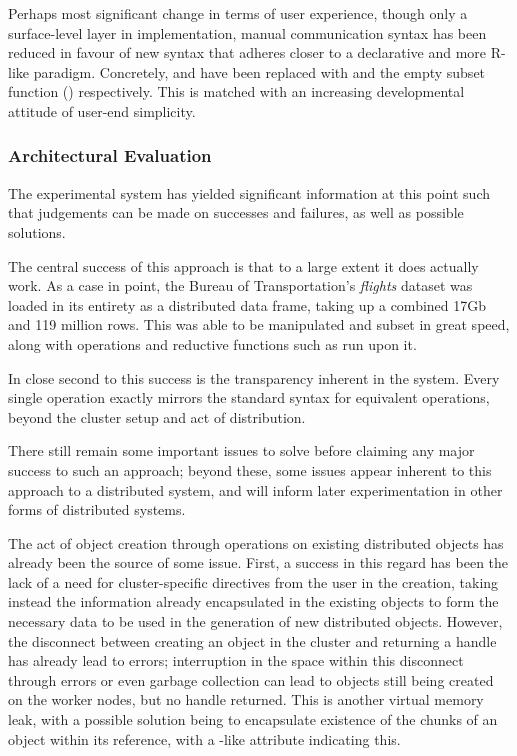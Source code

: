 Perhaps most significant change in terms of user experience, though only
a surface-level layer in implementation, manual communication syntax has
been reduced in favour of new syntax that adheres closer to a
declarative and more R-like paradigm. Concretely,  and
 have been replaced with  and the
empty subset function () respectively. This is matched
with an increasing developmental attitude of user-end simplicity.

\subsubsection{Architectural Evaluation}\label{sec:eval}

The experimental system has yielded significant information at this
point such that judgements can be made on successes and failures, as
well as possible solutions.

The central success of this approach is that to a large extent it does
actually work. As a case in point, the Bureau of Transportation's
\emph{flights} \cite{bot2009flights} dataset was loaded in its entirety
as a distributed data frame, taking up a combined 17Gb and 119 million
rows. This was able to be manipulated and subset in great speed, along
with operations and reductive functions such as  run upon
it.

In close second to this success is the transparency inherent in the
system. Every single operation exactly mirrors the standard \R{} syntax for
equivalent operations, beyond the cluster setup and act of distribution.

There still remain some important issues to solve before claiming any
major success to such an approach; beyond these, some issues appear
inherent to this approach to a distributed system, and will inform later
experimentation in other forms of distributed systems.

The act of object creation through operations on existing distributed
objects has already been the source of some issue. First, a success in
this regard has been the lack of a need for cluster-specific directives
from the user in the creation, taking instead the information already
encapsulated in the existing objects to form the necessary data to be
used in the generation of new distributed objects. However, the
disconnect between creating an object in the cluster and returning a
handle has already lead to errors; interruption in the space within this
disconnect through errors or even garbage collection can lead to objects
still being created on the worker nodes, but no handle returned. This is
another virtual memory leak, with a possible solution being to
encapsulate existence of the chunks of an object within its reference,
with a -like  attribute indicating this.

